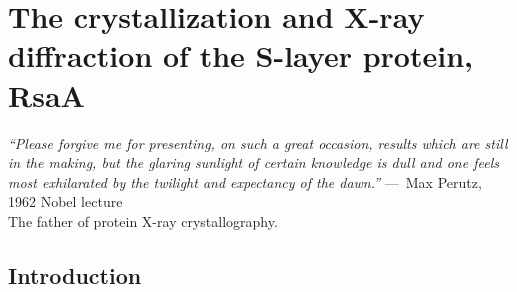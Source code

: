 \acresetall

\chapter{The crystallization and X-ray diffraction of the S-layer protein, RsaA}
\label{ch:crystal}
\begin{epigraph}
  \emph{``Please forgive me for presenting, on such a great occasion, results which are still in the making, but the glaring sunlight of certain knowledge is dull and one feels most exhilarated by the twilight and expectancy of the dawn.''} ---~Max Perutz, 1962 Nobel lecture\\ The father of protein X-ray crystallography.
\end{epigraph}
\section{Introduction} %
\label{sec:crystal_introduction} 